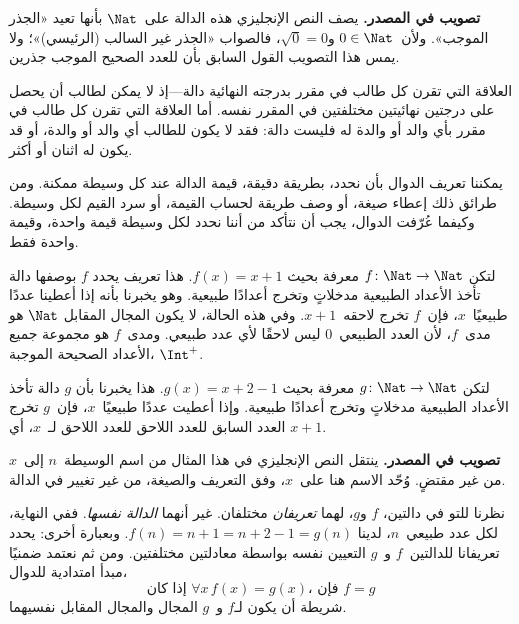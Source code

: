 \documentclass[../../../include/open-logic-section]{subfiles}
\begin{document}
\begin{explain}
\textbf{تصويب في المصدر.} يصف النص الإنجليزي هذه الدالة على~$\Nat$
بأنها تعيد «الجذر الموجب». ولأن~$0\in\Nat$ و$\sqrt{0}=0$، فالصواب
«الجذر غير السالب (الرئيسي)»؛ ولا يمس هذا التصويب القول السابق بأن
للعدد الصحيح الموجب جذرين.
\end{explain}

\begin{ex}
العلاقة التي تقرن كل طالب في مقرر بدرجته النهائية دالة---إذ لا يمكن
لطالب أن يحصل على درجتين نهائيتين مختلفتين في المقرر نفسه. أما العلاقة
التي تقرن كل طالب في مقرر بأي والد أو والدة له فليست دالة: فقد لا يكون
للطالب أي والد أو والدة، أو قد يكون له اثنان أو أكثر.
\end{ex}

\begin{explain}
يمكننا تعريف الدوال بأن نحدد، بطريقة دقيقة، قيمة الدالة
عند كل وسيطة ممكنة. ومن طرائق ذلك إعطاء صيغة، أو وصف طريقة لحساب
القيمة، أو سرد القيم لكل وسيطة. وكيفما عُرّفت الدوال، يجب
أن نتأكد من أننا نحدد لكل وسيطة قيمة واحدة، وقيمة واحدة فقط.
\end{explain}


\begin{ex}
لتكن $f \colon \Nat \to \Nat$ معرفة بحيث $f(x) = x+1$. هذا
تعريف يحدد $f$ بوصفها دالة تأخذ
الأعداد الطبيعية مدخلاتٍ وتخرج أعدادًا طبيعية. وهو يخبرنا بأنه إذا أعطينا
عددًا طبيعيًا~$x$، فإن~$f$ تخرج لاحقه~$x+1$.
وفي هذه الحالة، لا يكون المجال المقابل $\Nat$ هو مدى~$f$، لأن
العدد الطبيعي~$0$ ليس لاحقًا لأي عدد طبيعي. ومدى~$f$
هو مجموعة جميع الأعداد الصحيحة الموجبة، $\Int^{+}$.
\end{ex}

\begin{ex}
لتكن $g \colon \Nat \to \Nat$ معرفة بحيث $g(x) = x+2-1$. هذا
يخبرنا بأن $g$ دالة تأخذ الأعداد الطبيعية مدخلاتٍ
وتخرج أعدادًا طبيعية. وإذا أعطيت عددًا طبيعيًا~$x$، فإن~$g$ تخرج
العدد السابق للعدد اللاحق للعدد اللاحق لـ~$x$، أي
$x+1$.
\end{ex}

\begin{explain}
\textbf{تصويب في المصدر.} ينتقل النص الإنجليزي في هذا المثال من اسم
الوسيطة~$n$ إلى~$x$ من غير مقتضٍ. وُحّد الاسم هنا على~$x$، وفق
التعريف والصيغة، من غير تغيير في الدالة.
\end{explain}

\begin{explain}
نظرنا للتو في دالتين، $f$ و$g$، لهما
\emph{تعريفان} مختلفان. غير أنهما \emph{الدالة نفسها}. ففي
النهاية، لكل عدد طبيعي~$n$، لدينا $f(n) = n+1 = n+2-1 =
g(n)$. وبعبارة أخرى: يحدد تعريفانا للدالتين~$f$ و~$g$
التعيين نفسه بواسطة معادلتين مختلفتين. ومن ثم نعتمد ضمنيًا
مبدأ امتدادية للدوال،
\[
  \text{إذا كان }\forall x\, f(x) = g(x)\text{، فإن }f = g
\]
شريطة أن يكون لـ$f$ و~$g$ المجال والمجال المقابل نفسيهما.
\end{explain}
\end{document}

